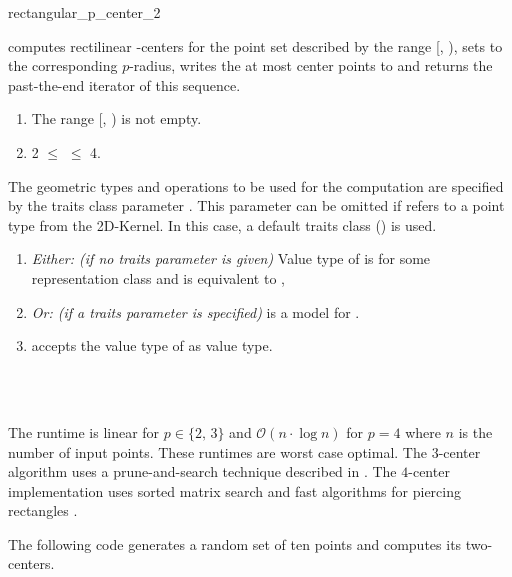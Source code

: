 \begin{ccRefFunction}{rectangular_p_center_2}
  
  computes rectilinear -centers for the point set described by
  the range [, ), sets  to the corresponding
  $p$-radius, writes the at most  center points to  and
  returns the past-the-end iterator of this sequence.
  
  \ccPrecond
  \begin{enumerate}
  \item The range [, ) is not empty.
  \item 2 $\le$  $\le$ 4.
  \end{enumerate}
  
  The geometric types and operations to be used for the computation
  are specified by the traits class parameter . This parameter
  can be omitted if  refers to a point type from
  the 2D-Kernel. In this case, a default traits class
  () is used.
  
  \ccRequire
  \begin{enumerate}
  \item \textit{Either: (if no traits parameter is given)} Value type
    of  is  for some
    representation class  and  is equivalent to
    ,
  \item \textit{Or: (if a traits parameter is specified)} 
    is a model for .
  \item {} accepts the value type of
     as value type.
  \end{enumerate}  
  
  \ccSeeAlso
  \\
  \\
  
  \ccImplementation The runtime is linear for $p \in \{2,\,3\}$ and
  $\mathcal{O}(n \cdot \log n)$ for $p = 4$ where $n$ is the number of
  input points. These runtimes are worst case optimal. The $3$-center
  algorithm uses a prune-and-search technique described in
  \cite{cgal:h-slacr-99}.  The $4$-center implementation uses sorted matrix
  search \cite{fj-fkppc-83,fj-gsrsm-84} and fast algorithms for
  piercing rectangles \cite{sw-rpppp-96}.
  
  \ccExample The following code generates a random set of ten points
  and computes its two-centers.

\end{ccRefFunction}

